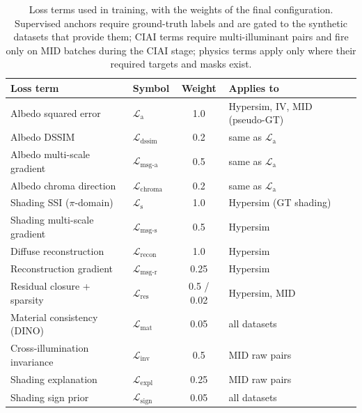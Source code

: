 \begin{table}[t!]
  \caption[Training loss terms and weights.]{%
    Loss terms used in training, with the weights of the final
    configuration.
    Supervised anchors require ground-truth labels and are gated to the
    synthetic datasets that provide them; CIAI terms require multi-illuminant
    pairs and fire only on MID batches during the CIAI stage; physics terms
    apply only where their required targets and masks exist.
  }
  \label{tab:losses}
  \centering
  \small
  \begin{tabular}{@{}llcl@{}}
    \toprule
    Loss term & Symbol & Weight & Applies to \\
    \midrule
    Albedo squared error         & $\mathcal{L}_{\text{a}}$        & 1.0  & Hypersim, IV, MID (pseudo-GT) \\
    Albedo DSSIM                 & $\mathcal{L}_{\text{dssim}}$    & 0.2  & same as $\mathcal{L}_{\text{a}}$ \\
    Albedo multi-scale gradient  & $\mathcal{L}_{\text{msg-a}}$    & 0.5  & same as $\mathcal{L}_{\text{a}}$ \\
    Albedo chroma direction      & $\mathcal{L}_{\text{chroma}}$   & 0.2  & same as $\mathcal{L}_{\text{a}}$ \\
    Shading SSI ($\pi$-domain)   & $\mathcal{L}_{\text{s}}$        & 1.0  & Hypersim (GT shading) \\
    Shading multi-scale gradient & $\mathcal{L}_{\text{msg-s}}$    & 0.5  & Hypersim \\
    Diffuse reconstruction       & $\mathcal{L}_{\text{recon}}$    & 1.0  & Hypersim \\
    Reconstruction gradient      & $\mathcal{L}_{\text{msg-r}}$    & 0.25 & Hypersim \\
    Residual closure + sparsity  & $\mathcal{L}_{\text{res}}$      & 0.5 / 0.02 & Hypersim, MID \\
    Material consistency (DINO)  & $\mathcal{L}_{\text{mat}}$      & 0.05 & all datasets \\
    Cross-illumination invariance      & $\mathcal{L}_{\text{inv}}$      & 0.5  & MID raw pairs \\
    Shading explanation          & $\mathcal{L}_{\text{expl}}$     & 0.25 & MID raw pairs \\
    Shading sign prior           & $\mathcal{L}_{\text{sign}}$     & 0.05 & all datasets \\
    \bottomrule
  \end{tabular}
\end{table}


